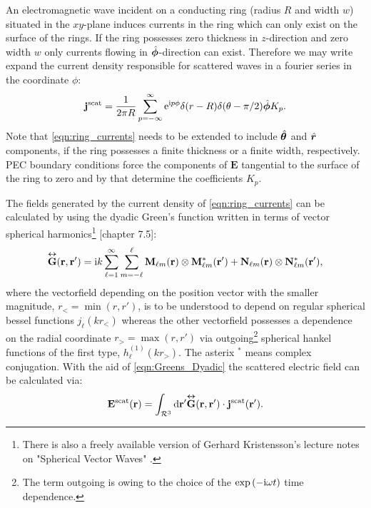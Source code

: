 An electromagnetic wave incident on a conducting ring (radius $R$ and width $w$) situated in the $xy$-plane induces currents in the ring which can only exist on the surface of the rings. If the ring possesses zero thickness in $z$-direction and zero width $w$ only currents flowing in $\hat{\bm{\phi}}$-direction can exist. Therefore we may write expand the current density responsible for scattered waves in a fourier series in the coordinate $\phi$:
\begin{equation}
\mathbf{j}^\text{scat} = \frac{1}{2\pi R}\sum_{p=-\infty}^\infty \mathrm{e}^{\mathrm{i} p \phi} \delta(r-R) \delta(\theta-\pi/2) \hat{\bm{\phi}}K_p.
\label{eqn:ring_currents}
\end{equation}
Note that \cref{eqn:ring_currents} needs to be extended to include $\hat{\bm{\theta}}$ and $\hat{\bm{r}}$ components, if the ring possesses a finite thickness or a finite width, respectively. PEC boundary conditions force the components of $\mathbf{E}$ tangential to the surface of the ring to zero and by that determine the coefficients $K_p$.

The fields generated by the current density of \cref{eqn:ring_currents} can be
calculated by using the dyadic Green's function written in terms of vector spherical harmonics\footnote{There is also a freely available version of Gerhard Kristensson's lecture notes on "Spherical Vector Waves" \citep{Kristensson2014}.} \Cite{Kristensson2016}[chapter 7.5]:
\begin{equation}
\overset{\bm\leftrightarrow}{\mathbf{G}}(\mathbf{r},\mathbf{r}') = \mathrm{i} k \sum_{\ell=1}^\infty \sum_{m=-\ell}^\ell
\mathbf{M}_{\ell m}(\mathbf{r})\otimes\mathbf{M}_{\ell m}^*(\mathbf{r}')+
\mathbf{N}_{\ell m}(\mathbf{r})\otimes\mathbf{N}_{\ell m}^*(\mathbf{r}'),
\label{eqn:Greens_Dyadic}
\end{equation}
where the vectorfield depending on the position vector with the smaller magnitude, $r_<=\min\left(r, r'\right)$, is to be understood to depend on regular spherical bessel functions $j_\ell(kr_<)$ whereas the other vectorfield possesses a dependence on the radial coordinate $r_>=\max\left(r, r'\right)$ via outgoing\footnote{The term outgoing is owing to the choice of the $\exp\left(-\mathrm{i}\omega t\right)$ time dependence.} spherical hankel functions of the first type, $h_\ell^{(1)}(kr_>)$.
The asterix $^*$ means complex conjugation. With the aid of \cref{eqn:Greens_Dyadic} the scattered electric field can be calculated via:
\begin{equation}
\mathbf{E}^\text{scat}(\mathbf{r}) = \int_{\mathcal{R}^3}  \mathrm{d} \mathbf{r}' 
\overset{\bm\leftrightarrow}{\mathbf{G}}(\mathbf{r},\mathbf{r}') \cdot \mathbf{j}^\text{scat}(\mathbf{r}').
\label{eqn:E_scattered}
\end{equation}

